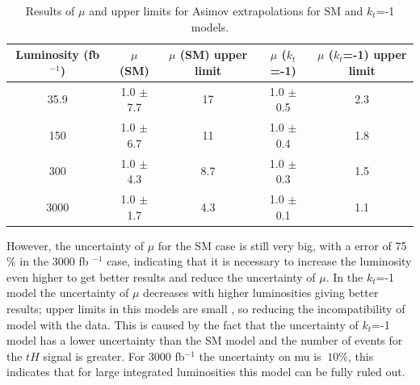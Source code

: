 \begin{linenumbers}
	\begin{table}[ht!]
		\caption{Results of $\mu$ and upper limits for Asimov extrapolations for SM and $k_t$=-1 models.}
		\begin{tabular}{|c|c|c|c|c|}
			\hline
			Luminosity (fb $^{-1}$)	&$\mu$ (SM) &$\mu$ (SM) upper limit    &   $\mu$ ($k_t$=-1) &$\mu$ ($k_t$=-1) upper limit   \\
			\hline
			35.9 & 1.0 $\pm$  7.7 &  17  & 1.0 $\pm$  0.5 & 2.3  \\
			\hline
			150& 1.0 $\pm$  6.7& 11  &  1.0 $\pm$  0.4 &1.8\\
			\hline
			300&1.0 $\pm$  4.3 &8.7 &  1.0 $\pm$  0.3 &1.5 \\
			\hline
			3000&1.0 $\pm$  1.7 & 4.3  &	 1.0 $\pm$  0.1 & 1.1\\
			\hline
		\end{tabular}
		\label{upper}
	\end{table}
	
	
	
	However, the uncertainty of $\mu$ for the SM case is still very big, with a error of 75 $\%$ in the 3000 fb $^{-1}$ case, indicating that it is necessary to increase the luminosity even higher to get better results and reduce the uncertainty of $\mu$. 
	In the $k_t$=-1 model the uncertainty of $\mu$ decreases with higher luminosities  giving better results; upper limits in this models are small , so reducing the incompatibility of model with the data. This is caused by the fact that the uncertainty of $k_t$=-1 model has a lower uncertainty than the SM model and the number of events for the $tH$ signal is greater. For 3000 fb$^{-1}$ the uncertainty on mu is $~10\%$, this indicates that for large integrated luminosities this model can be fully ruled out.
	
\end{linenumbers}
